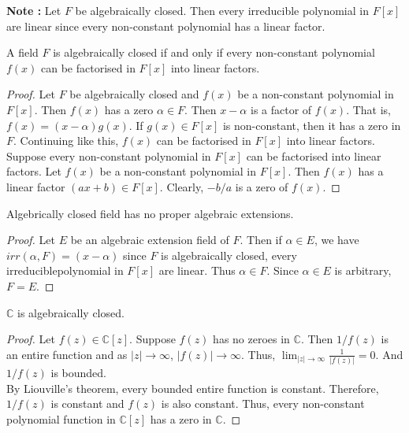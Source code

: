 \textbf{Note : } Let $F$ be algebraically closed. Then every irreducible polynomial in $F[x]$ are linear since every non-constant polynomial has a linear factor.

\begin{theorem}
	A field $F$ is algebraically closed if and only if every non-constant polynomial $f(x)$ can be factorised in $F[x]$ into linear factors.
\end{theorem}
\begin{proof}
	Let $F$ be algebraically closed and $f(x)$ be a non-constant polynomial in $F[x]$. Then $f(x)$ has a zero $\alpha \in F$. Then $x-\alpha$ is a factor of $f(x)$. That is, $f(x) = (x-\alpha)g(x)$. If $g(x) \in F[x]$ is non-constant, then it has a zero in $F$. Continuing like this, $f(x)$ can be factorised in $F[x]$ into linear factors.\\

	Suppose every non-constant polynomial in $F[x]$ can be factorised into linear factors. Let $f(x)$ be a non-constant polynomial in $F[x]$. Then $f(x)$ has a linear factor $(ax+b) \in F[x]$. Clearly, $-b/a$ is a zero of $f(x)$.
\end{proof}

\begin{theorem}
	Algebrically closed field has no proper algebraic extensions.
\end{theorem}
\begin{proof}
	Let $E$ be an algebraic extension field of $F$. Then if $\alpha \in E$, we have $irr(\alpha,F) = (x-\alpha)$ since $F$ is algebraically closed, every irreduciblepolynomial in $F[x]$ are linear. Thus $\alpha \in F$. Since $\alpha \in E$ is arbitrary, $F = E$.
\end{proof}

\begin{theorem}
	$\mathbb{C}$ is algebraically closed.
\end{theorem}
\begin{proof}
	Let $f(z) \in \mathbb{C}[z]$. Suppose $f(z)$ has no zeroes in $\mathbb{C}$. Then $1/f(z)$ is an entire function and as $|z| \to \infty$, $|f(z)| \to \infty$. Thus, $\lim_{|z|\to\infty} \frac{1}{|f(z)|} = 0$. And $1/f(z)$ is bounded.\\
	
	By Liouville's theorem, every bounded entire function is constant. Therefore, $1/f(z)$ is constant and $f(z)$ is also constant. Thus, every non-constant polynomial function in $\mathbb{C}[z]$ has a zero in $\mathbb{C}$.
\end{proof}

